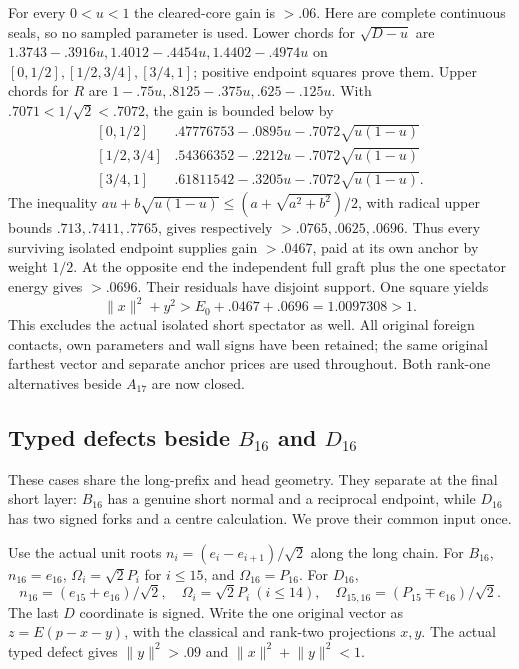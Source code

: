 \documentclass[11pt]{article}
\theoremstyle{definition}
\theoremstyle{remark}
\newcommand{\norm}[1]{\lVert #1\rVert}
\begin{document}
For every \(0<u<1\) the cleared-core gain is \(>.06\).
Here are complete continuous seals, so no sampled parameter is used.
Lower chords for \(\sqrt{D-u}\) are
\(1.3743-.3916u,1.4012-.4454u,1.4402-.4974u\)
on \([0,1/2],[1/2,3/4],[3/4,1]\); positive endpoint squares
prove them. Upper chords for \(R\) are
\(1-.75u,.8125-.375u,.625-.125u\).
With \(.7071<1/\sqrt2<.7072\), the gain is bounded below by
\[
\begin{array}{c|c}
{}[0,1/2]&.47776753-.0895u-.7072\sqrt{u(1-u)}\\
{}[1/2,3/4]&.54366352-.2212u-.7072\sqrt{u(1-u)}\\
{}[3/4,1]&.61811542-.3205u-.7072\sqrt{u(1-u)}.
\end{array}
\]
The inequality \(au+b\sqrt{u(1-u)}\le(a+\sqrt{a^2+b^2})/2\),
with radical upper bounds \(.713,.7411,.7765\), gives respectively
\(>.0765,.0625,.0696\). Thus every surviving isolated endpoint
supplies gain \(>.0467\), paid at its own anchor by weight \(1/2\).
At the opposite end the independent full graft plus the one spectator
energy gives \(>.0696\). Their residuals have disjoint support.
One square yields
\[
 \norm x^2+y^2>E_0+.0467+.0696=1.0097308>1.
\]
This excludes the actual isolated short spectator as well. All original
foreign contacts, own parameters and wall signs have been retained;
the same original farthest vector and separate anchor prices are used
throughout. Both rank-one alternatives beside \(A_{17}\) are now closed.

\subsection[Typed defects beside B16 and D16]{Typed defects beside \(B_{16}\) and \(D_{16}\)}
\label{app:BD16typed18}
These cases share the long-prefix and head geometry. They separate at
the final short layer: \(B_{16}\) has a genuine short normal and a
reciprocal endpoint, while \(D_{16}\) has two signed forks and a
centre calculation. We prove their common input once.

Use the actual unit roots \(n_i=(e_i-e_{i+1})/\sqrt2\) along
the long chain. For \(B_{16}\), \(n_{16}=e_{16}\),
\(\Omega_i=\sqrt2P_i\) for \(i\le15\), and
\(\Omega_{16}=P_{16}\). For \(D_{16}\),
\[
 n_{16}=(e_{15}+e_{16})/\sqrt2,\quad
 \Omega_i=\sqrt2P_i\ (i\le14),\quad
 \Omega_{15,16}=(P_{15}\mp e_{16})/\sqrt2.
\]
The last \(D\) coordinate is signed. Write the one original vector
as \(z=E(p-x-y)\), with the classical and rank-two projections
\(x,y\). The actual typed defect gives \(\norm y^2>.09\) and
\(\norm x^2+\norm y^2<1\).
\end{document}
